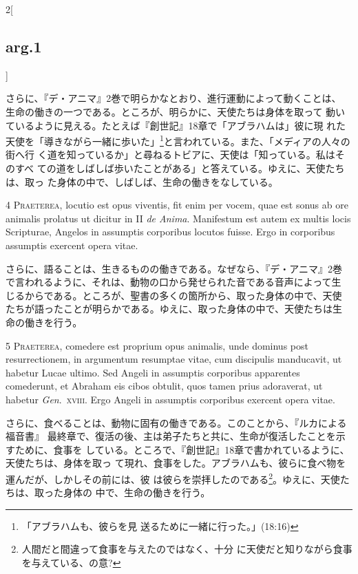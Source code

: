 \documentclass[paper=a4paper,fontsize=10pt,jafontsize=9pt,titlepage]{jlreq}
\begin{document}
\begin{paracol}{2}[\subsection{arg.1}]
\switchcolumn

さらに、『デ・アニマ』2巻で明らかなとおり、進行運動によって動くことは、
 生命の働きの一つである。ところが、明らかに、天使たちは身体を取って
 動いているように見える。たとえば『創世記』18章で「アブラハムは」彼に現
 れた天使を「導きながら一緒に歩いた」\footnote{「アブラハムも、彼らを見
 送るために一緒に行った。」(18:16)}と言われている。また、「メディアの人々の街へ行
 く道を知っているか」と尋ねるトビアに、天使は「知っている。私はそのすべ
 ての道をしばしば歩いたことがある」と答えている。ゆえに、天使たちは、取っ
 た身体の中で、しばしば、生命の働きをなしている。


{\scshape 4 Praeterea}, locutio est opus viventis, fit
enim per vocem, quae est sonus ab ore animalis prolatus ut dicitur in II
{\itshape de Anima}. Manifestum est autem ex multis locis Scripturae, Angelos in
assumptis corporibus locutos fuisse. Ergo in corporibus assumptis
exercent opera vitae.

\switchcolumn

さらに、語ることは、生きるものの働きである。なぜなら、『デ・アニマ』2巻
 で言われるように、それは、動物の口から発せられた音である音声によって生
 じるからである。ところが、聖書の多くの箇所から、取った身体の中で、天使
 たちが語ったことが明らかである。ゆえに、取った身体の中で、天使たちは生
 命の働きを行う。


{\scshape 5 Praeterea}, comedere est proprium opus animalis, unde dominus post
resurrectionem, in argumentum resumptae vitae, cum discipulis manducavit, ut
habetur Lucae ultimo. Sed Angeli in assumptis corporibus apparentes comederunt,
et Abraham eis cibos obtulit, quos tamen prius adoraverat, ut habetur {\itshape
Gen}.~{\scshape xviii}. Ergo Angeli in assumptis corporibus exercent opera
vitae.

\switchcolumn

さらに、食べることは、動物に固有の働きである。このことから、『ルカによる福音書』
 最終章で、復活の後、主は弟子たちと共に、生命が復活したことを示すために、食事を
 している。ところで、『創世記』18章で書かれているように、天使たちは、身体を取っ
 て現れ、食事をした。アブラハムも、彼らに食べ物を運んだが、しかしその前には、彼
 は彼らを崇拝したのである\footnote{人間だと間違って食事を与えたのではなく、十分
 に天使だと知りながら食事を与えている、の意?}。ゆえに、天使たちは、取った身体の
 中で、生命の働きを行う。


\end{paracol}
\end{document}
